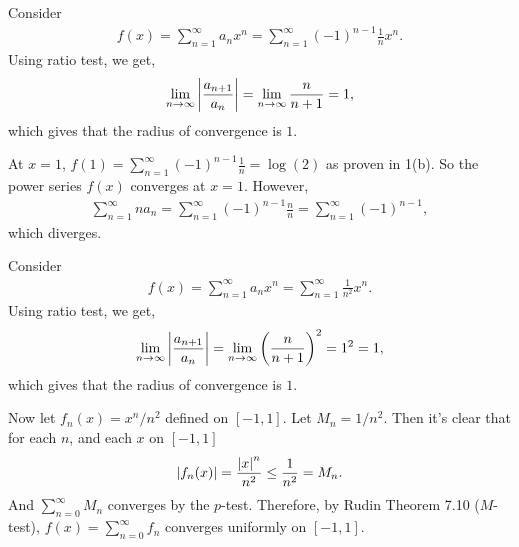\documentclass[12pt]{article}
\begin{document}
\begin{fproof}[5(a)]
 Consider 
 \begin{align*}
    f(x) = \sum_{n=1}^{\infty} a_n x^n = \sum_{n=1}^{\infty} (-1)^{n-1}\frac{1}{n} x^n.
 \end{align*}
 Using ratio test, we get,
 \begin{align*}
    \lim_{n \to \infty} \left\lvert \frac{a_{n+1}}{a_n} \right\rvert = \lim_{n \to \infty} \frac{n}{n+1} = 1,
 \end{align*}
 which gives that the radius of convergence is \(1\).
 
 At \(x = 1\), \(f(1) = \sum_{n=1}^{\infty} (-1)^{n-1} \frac{1}{n} = \log(2)\) as proven in 1(b).
 So the power series \(f(x)\) converges at \(x = 1\).
 However, 
 \begin{align*}
    \sum_{n=1}^{\infty} n a_n =\sum_{n=1}^{\infty} (-1)^{n-1} \frac{n}{n} = \sum_{n=1}^{\infty} (-1)^{n-1},
 \end{align*}
 which diverges.

\end{fproof}

\begin{fproof}[5(b)]
 Consider
 \begin{align*}
    f(x) = \sum_{n=1}^{\infty} a_n x^n = \sum_{n=1}^{\infty} \frac{1}{n^2} x^n.
 \end{align*}
 Using ratio test, we get,
 \begin{align*}
    \lim_{n \to \infty} \left\lvert \frac{a_{n+1}}{a_n} \right\rvert = \lim_{n \to \infty} \left( \frac{n}{n+1} \right)^2 = 1^2 = 1,
 \end{align*}
 which gives that the radius of convergence is \(1\).

 Now let \(f_n(x) = x^n/n^2\) defined on \([-1,1]\).
 Let \(M_n = 1/n^2\).
 Then it's clear that for each \(n\), and each \(x\) on \([-1,1]\)
 \begin{align*}
    \left\lvert f_n(x) \right\rvert = \frac{\left\lvert x \right\rvert^n}{n^2} \leq \frac{1}{n^2} = M_n.
 \end{align*}
 And \(\sum_{n=0}^{\infty} M_n\) converges by the \(p\)-test.
 Therefore, by Rudin Theorem 7.10 (\(M\)-test), \(f(x) = \sum_{n=0}^{\infty}f_n\) converges uniformly on \([-1,1]\).
\end{fproof}
\end{document}
